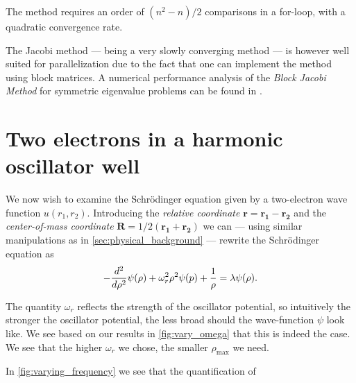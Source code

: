 \documentclass[a4paper, 10pt]{amsart}
\renewcommand{\v}[1]{\mathbf{#1}}
\begin{document}
The method requires an order of $(n^2 - n)/2$ comparisons in a for-loop, with a
quadratic convergence rate.

The Jacobi method --- being a very slowly converging method --- is however well
suited for parallelization due to the fact that one can implement the method
using block matrices. A numerical performance analysis of the \emph{Block
Jacobi Method} for symmetric eigenvalue problems can be found in
\cite{blockjaco}.

\section{Two electrons in a harmonic oscillator well}
\label{sec:electrons_in_a_harmonic_oscillator_well}

We now wish to examine the Schr\"odinger equation given by a two-electron wave
function $u(r_1, r_2)$.  Introducing the \emph{relative coordinate} $\v{r} =
\v{r_1} - \v{r_2}$ and the \emph{center-of-mass coordinate} $\v{R} = 1/2
(\v{r_1} + \v{r_2})$ we can --- using similar manipulations as in
\cref{sec:physical_background} --- rewrite the Schr\"odinger equation as
\begin{equation}
  \notag
  -\frac{d^2}{d\rho^2}\psi(\rho) + \omega_r^2\rho^2\psi(p) + \frac{1}{\rho} = \lambda\psi(\rho).
\end{equation}

The quantity $\omega_r$ reflects the strength of the oscillator potential, so
intuitively the stronger the oscillator potential, the less broad should the
wave-function $\psi$ look like. We see based on our results in
\cref{fig:vary_omega} that this is indeed the case. We see that the
higher $\omega_r$ we chose, the smaller $\rho_{ \textrm{max} }$ we need.

In \cref{fig:varying_frequency} we see that the quantification of
\end{document}
